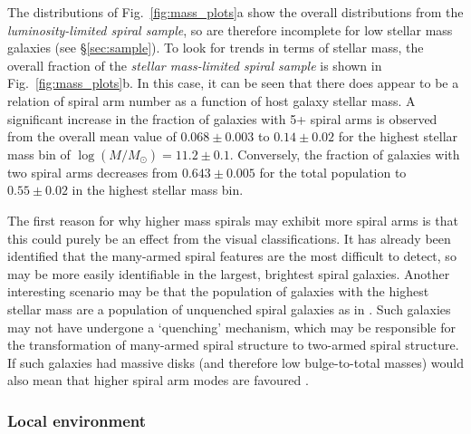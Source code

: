\documentclass[useAMS,usenatbib]{mn2e}
\begin{document}
The distributions of Fig.~\ref{fig:mass_plots}a show the overall distributions from the \textit{luminosity-limited spiral sample}, so are therefore incomplete for low stellar mass galaxies (see \S\ref{sec:sample}). To look for trends in terms of stellar mass, the overall fraction of the \textit{stellar mass-limited spiral sample} is shown in Fig.~\ref{fig:mass_plots}b. In this case, it can be seen that there does appear to be a relation of spiral arm number as a function of host galaxy stellar mass. A significant increase in the fraction of galaxies with 5+ spiral arms is observed from the overall mean value of $0.068 \pm 0.003$ to $0.14 \pm 0.02$ for the highest stellar mass bin of $\log(M/M_{\odot}) = 11.2 \pm 0.1$. Conversely, the fraction of galaxies with two spiral arms decreases from $0.643 \pm 0.005$ for the total population to $0.55 \pm 0.02$ in the highest stellar mass bin. 

The first reason for why higher mass spirals may exhibit more spiral arms is that this could purely be an effect from the visual classifications. It has already been  identified that the many-armed spiral features are the most difficult to detect, so  may be more easily identifiable in the largest, brightest spiral galaxies. Another interesting scenario may be that the population of galaxies with the highest stellar mass are a population of unquenched spiral galaxies as in \citealt{Ogle_16}. Such galaxies may not have undergone a `quenching' mechanism, which may be responsible for the transformation of many-armed spiral structure to two-armed spiral structure. If such galaxies had massive disks (and therefore low bulge-to-total masses) would also mean that higher spiral arm modes are favoured \citep{Donghia_15}.
\subsubsection{Local environment}
\label{sec:environment}
\end{document}
